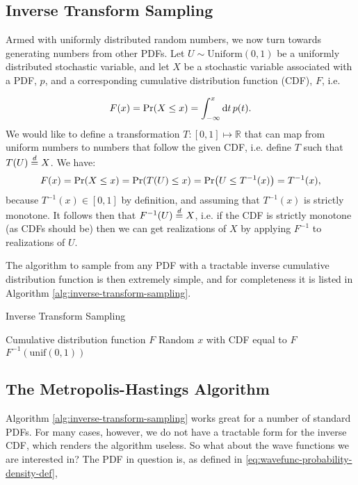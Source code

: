 \documentclass[Thesis.tex]{subfiles}
\begin{document}
\subsection{Inverse Transform Sampling}

Armed with uniformly distributed random numbers, we now turn towards generating
numbers from other PDFs. Let $U\sim\text{Uniform}(0,1)$ be a uniformly
distributed stochastic variable, and let $X$ be a stochastic variable
associated with a PDF, $p$, and a corresponding cumulative distribution
function (CDF), $F$, i.e.

\begin{align}
    F(x) = \text{Pr}\qty(X\leq x) = \int_{-\infty}^x \dd{t}p(t).
\end{align}
We would like to define a transformation $T:[0, 1]\mapsto\mathbb{R}$ that can map from uniform numbers to numbers that follow the given CDF, i.e. define $T$ such that $T(U)\overset{d}{=} X$. We have:
\begin{align}
    F(x) = \text{Pr}\qty(X\leq x) = \text{Pr}\qty(T(U)\leq x) = \text{Pr}\qty(U \leq T^{-1}(x)) = T^{-1}(x),
\end{align}
because $T^{-1}(x)\in[0, 1]$ by definition, and assuming that $T^{-1}(x)$ is strictly monotone. It follows then that $F^{-1}(U)\overset{d}{=} X$, i.e. if the CDF is strictly monotone (as CDFs should be) then we can get realizations of $X$ by applying $F^{-1}$ to realizations of $U$.

The algorithm to sample from any PDF with a tractable inverse cumulative
distribution function is then extremely simple, and for completeness it is
listed in Algorithm \autoref{alg:inverse-transform-sampling}.

\begin{algorithm}[h]
    \caption{Inverse Transform Sampling}
    \label{alg:inverse-transform-sampling}
    \begin{algorithmic}[1]
        \Require Cumulative distribution function $F$
        \Ensure Random $x$ with CDF equal to $F$
        \Repeat
          \State \Yield $F^{-1}(\text{unif}(0, 1))$
    \end{algorithmic}
\end{algorithm}

\subsection{The Metropolis-Hastings Algorithm}

Algorithm \autoref{alg:inverse-transform-sampling} works great for a number of standard
PDFs. For many cases, however, we do not have a tractable form for the inverse
CDF, which renders the algorithm useless. So what about the wave functions we
are interested in? The PDF in question is, as defined in \autoref{eq:wavefunc-probability-density-def},
\end{document}
